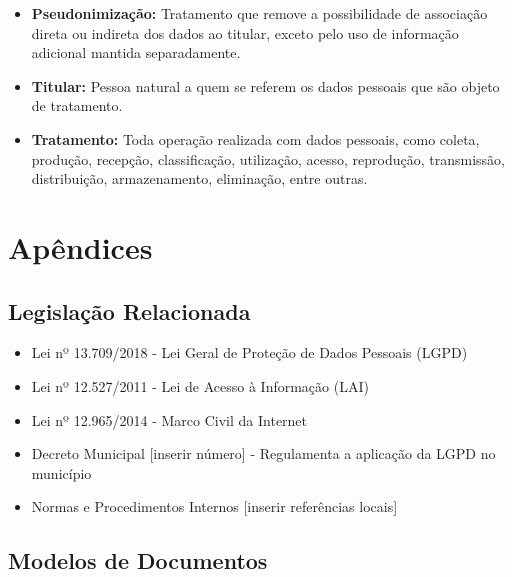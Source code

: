 \documentclass[12pt,a4paper]{article}
\begin{document}
\begin{itemize}
    \item \textbf{Pseudonimização:} Tratamento que remove a possibilidade de associação direta ou indireta dos dados ao titular, exceto pelo uso de informação adicional mantida separadamente.
    
    \item \textbf{Titular:} Pessoa natural a quem se referem os dados pessoais que são objeto de tratamento.
    
    \item \textbf{Tratamento:} Toda operação realizada com dados pessoais, como coleta, produção, recepção, classificação, utilização, acesso, reprodução, transmissão, distribuição, armazenamento, eliminação, entre outras.
\end{itemize}

\newpage
\section{Apêndices}

\subsection{Legislação Relacionada}
\begin{itemize}
    \item Lei nº 13.709/2018 - Lei Geral de Proteção de Dados Pessoais (LGPD)
    \item Lei nº 12.527/2011 - Lei de Acesso à Informação (LAI)
    \item Lei nº 12.965/2014 - Marco Civil da Internet
    \item Decreto Municipal [inserir número] - Regulamenta a aplicação da LGPD no município
    \item Normas e Procedimentos Internos [inserir referências locais]
\end{itemize}

\subsection{Modelos de Documentos}
\end{document}
